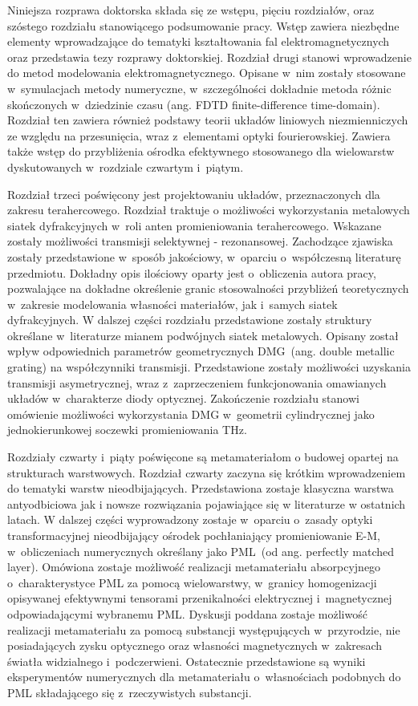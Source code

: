 Niniejsza rozprawa doktorska składa się ze wstępu, pięciu rozdziałów, oraz szóstego rozdziału stanowiącego podsumowanie pracy. Wstęp zawiera niezbędne elementy wprowadzające do tematyki kształtowania fal elektromagnetycznych oraz przedstawia tezy rozprawy doktorskiej. Rozdział drugi stanowi wprowadzenie do metod modelowania elektromagnetycznego. Opisane w~nim zostały stosowane w~symulacjach metody numeryczne, w~szczególności dokładnie metoda różnic skończonych w~dziedzinie czasu (ang. FDTD finite-difference time-domain). Rozdział ten zawiera również podstawy teorii układów liniowych niezmienniczych ze względu na przesunięcia, wraz z~elementami optyki fourierowskiej. Zawiera także wstęp do przybliżenia ośrodka efektywnego stosowanego dla wielowarstw dyskutowanych w~rozdziale czwartym i~piątym.

Rozdział trzeci poświęcony jest projektowaniu układów, przeznaczonych dla zakresu terahercowego. Rozdział traktuje o możliwości wykorzystania metalowych siatek dyfrakcyjnych w~roli anten promieniowania terahercowego. Wskazane zostały możliwości transmisji  selektywnej - rezonansowej. Zachodzące zjawiska zostały przedstawione w~sposób jakościowy, w~oparciu o~współczesną literaturę przedmiotu. Dokładny opis ilościowy oparty jest o~obliczenia autora pracy, pozwalające na dokładne określenie granic stosowalności przybliżeń teoretycznych w~zakresie modelowania własności materiałów, jak i~samych siatek dyfrakcyjnych. W dalszej części rozdziału przedstawione zostały struktury określane w~literaturze mianem podwójnych siatek metalowych. Opisany został wpływ odpowiednich parametrów geometrycznych DMG~(ang. double metallic grating) na współczynniki transmisji. Przedstawione zostały możliwości uzyskania transmisji asymetrycznej, wraz z~zaprzeczeniem funkcjonowania omawianych układów w~charakterze diody optycznej. Zakończenie rozdziału stanowi omówienie możliwości wykorzystania DMG w~geometrii cylindrycznej jako jednokierunkowej soczewki promieniowania THz.

Rozdziały czwarty i~piąty poświęcone są metamateriałom o budowej opartej na strukturach warstwowych. Rozdział czwarty zaczyna się krótkim wprowadzeniem do tematyki warstw nieodbijających. Przedstawiona zostaje klasyczna warstwa antyodbiciowa jak i nowsze rozwiązania pojawiające się w literaturze w ostatnich latach. W dalszej części wyprowadzony zostaje w~oparciu o~zasady optyki transformacyjnej nieodbijający ośrodek pochłaniający promieniowanie E-M, w~obliczeniach numerycznych określany jako PML~(od ang. perfectly matched layer). Omówiona zostaje możliwość realizacji metamateriału absorpcyjnego o~charakterystyce PML za pomocą wielowarstwy, w~granicy homogenizacji opisywanej efektywnymi tensorami przenikalności elektrycznej i~magnetycznej odpowiadającymi wybranemu PML. Dyskusji poddana zostaje możliwość realizacji metamateriału za pomocą substancji występujących w~przyrodzie, nie posiadających zysku optycznego oraz własności magnetycznych w~zakresach światła widzialnego i~podczerwieni. Ostatecznie przedstawione są wyniki eksperymentów numerycznych dla metamateriału o~własnościach podobnych do PML składającego się z~rzeczywistych substancji.

